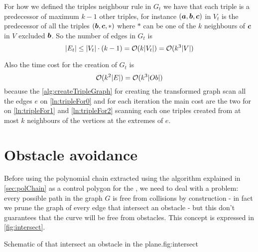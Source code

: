 \documentclass[dissertation.tex]{subfiles}
\begin{document}
For how we defined the triples neighbour rule in $G_t$ we have
that each triple is a predecessor of maximum $k-1$ other triples, for
instance $(\boldsymbol{a},\boldsymbol{b},\boldsymbol{c})$ in $V_t$ is the predecessor of all the triples
$(\boldsymbol{b},\boldsymbol{c},*)$ where $*$ can be one of the $k$ neighbours
of $\boldsymbol{c}$ in $V$ excluded $\boldsymbol{b}$. So the number of edges in $G_t$ is
\begin{equation}
  \label{eq:numEdgesTriples}
  |E_t|\leq |V_t|\cdot (k-1)=\mathcal{O}(k|V_t|)=\mathcal{O}(k^3|V|)
\end{equation}

Also the time cost for the creation of $G_t$ is
\newcommand{\eqCostVt}{\ensuremath{\bigO(k^3|Ob|)}}
\begin{equation}
  \label{eq:costVt}
  \bigO(k^2|E|)=\eqCostVt
\end{equation}
because the \cref{alg:createTripleGraph} for creating the transformed
graph scan all the edges $e$ on \cref{ln:tripleFor0} and for each
iteration
the main cost are the two for on \cref{ln:tripleFor1} and
\cref{ln:tripleFor2} scanning each one triples created from at most
$k$ neighbours
of the vertices at the extremes of $e$.

\section{Obstacle avoidance}\label{sec:obsAvoid}
Before using the polynomial chain extracted using the algorithm
explained in \cref{sec:polChain} as a control polygon for the
\bs, we need to deal with a
problem: every possible path in the graph $G$ is
free from collisions by construction - in fact we prune the graph of
every edge that intersect an obstacle - but this don't guarantees that
the curve will be free from obstacles. This concept is expressed in \cref{fig:intersect}.
\begin{myfig}{Schematic of \bs that intersect an obstacle in the plane.}{fig:intersect}
\end{myfig}
\end{document}
